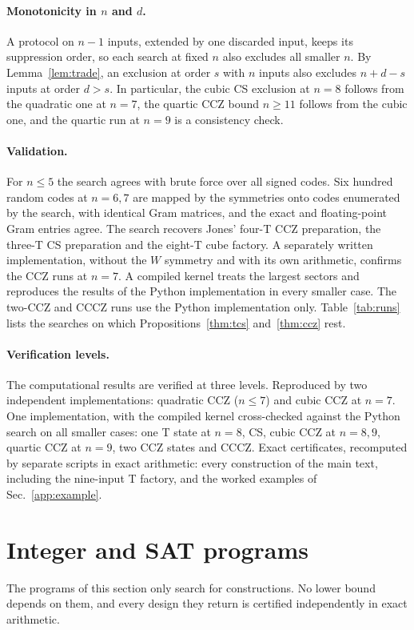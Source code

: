 \documentclass[aps,prl,reprint,twocolumn,amsmath,amssymb,floatfix,nofootinbib,superscriptaddress]{revtex4-2}
\begin{document}
\paragraph*{Monotonicity in $n$ and $d$.}
A protocol on $n-1$ inputs, extended by one discarded input, keeps its suppression order, so each search at fixed $n$ also excludes all smaller $n$. By Lemma~\ref{lem:trade}, an exclusion at order $s$ with $n$ inputs also excludes $n+d-s$ inputs at order $d>s$. In particular, the cubic CS exclusion at $n=8$ follows from the quadratic one at $n=7$, the quartic CCZ bound $n\geq11$ follows from the cubic one, and the quartic run at $n=9$ is a consistency check.

\paragraph*{Validation.}
For $n\leq5$ the search agrees with brute force over all signed codes. Six hundred random codes at $n=6,7$ are mapped by the symmetries onto codes enumerated by the search, with identical Gram matrices, and the exact and floating-point Gram entries agree. The search recovers Jones' four-T CCZ preparation, the three-T CS preparation and the eight-T cube factory. A separately written implementation, without the $W$ symmetry and with its own arithmetic, confirms the CCZ runs at $n=7$. A compiled kernel treats the largest sectors and reproduces the results of the Python implementation in every smaller case. The two-CCZ and CCCZ runs use the Python implementation only. Table~\ref{tab:runs} lists the searches on which Propositions~\ref{thm:tcs} and~\ref{thm:ccz} rest.

\paragraph*{Verification levels.}
The computational results are verified at three levels. Reproduced by two independent implementations: quadratic CCZ ($n\leq7$) and cubic CCZ at $n=7$. One implementation, with the compiled kernel cross-checked against the Python search on all smaller cases: one T state at $n=8$, CS, cubic CCZ at $n=8,9$, quartic CCZ at $n=9$, two CCZ states and CCCZ. Exact certificates, recomputed by separate scripts in exact arithmetic: every construction of the main text, including the nine-input T factory, and the worked examples of Sec.~\ref{app:example}.

\section{Integer and SAT programs}\label{app:programs}
The programs of this section only search for constructions. No lower bound depends on them, and every design they return is certified independently in exact arithmetic.
\end{document}
